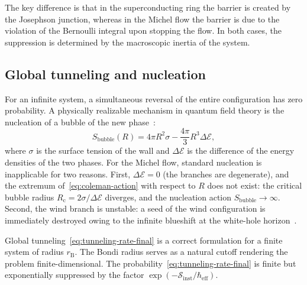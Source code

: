 \documentclass[12pt,a4paper,preprint]{elsarticle}
\begin{document}
            The key difference is that in the superconducting ring the barrier is created by the Josephson junction, whereas in the Michel flow the barrier is due to the violation of the Bernoulli integral upon stopping the flow. In both cases, the suppression is determined by the macroscopic inertia of the system.

        \subsection{Global tunneling and nucleation}\label{subsec:nucleation}
            For an infinite system, a simultaneous reversal of the entire configuration has zero probability. A physically realizable mechanism in quantum field theory is the nucleation of a bubble of the new phase~\cite{ColemanS_AspectsOfSymmetry_1985}:
            \begin{equation}
                S_{\mathrm{bubble}}(R) = 4\pi R^{2}\sigma - \frac{4\pi}{3}R^{3}\Delta\mathcal{E},
                \label{eq:coleman-action}
            \end{equation}
            where $\sigma$ is the surface tension of the wall and $\Delta\mathcal{E}$ is the difference of the energy densities of the two phases. For the Michel flow, standard nucleation is inapplicable for two reasons. First, $\Delta\mathcal{E} = 0$ (the branches are degenerate), and the extremum of~\eqref{eq:coleman-action} with respect to $R$ does not exist: the critical bubble radius $R_{\mathrm{c}} = 2\sigma/\Delta\mathcal{E}$ diverges, and the nucleation action $S_{\mathrm{bubble}} \to \infty$. Second, the wind branch is unstable: a seed of the wind configuration is immediately destroyed owing to the infinite blueshift at the white-hole horizon~\cite{SemyannikovAV_GlobalAcousticGeometryOfMichelFlowInPainleveGullstrandCoordinates_2026}.
            
            Global tunneling~\eqref{eq:tunneling-rate-final} is a correct formulation for a finite system of radius $r_{\mathrm{B}}$. The Bondi radius serves as a natural cutoff rendering the problem finite-dimensional. The probability~\eqref{eq:tunneling-rate-final} is finite but exponentially suppressed by the factor $\exp(-\mathcal{S}_{\mathrm{inst}}/\hbar_{\mathrm{eff}})$.
\end{document}
